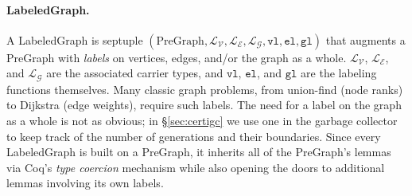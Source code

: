 \documentclass[acmsmall,screen]{acmart}
\newcommand{\li}[1]{{\texttt{\small #1}}}
\newcommand\hide[1]{}
\newcommand{\p}[1]{\ensuremath{\mathsf{#1}}} \newcommand{\m}[1]{\ensuremath{\mathit{#1}}} \newcommand{\ma}[1]{\ensuremath{\mathcal{#1}}} \let\ramify\lightning
\begin{document}
\hide
{In \S\ref{sec:spacegraph} we will tie a mathematical graph $\gamma$ to
a spatial graph predicate
$\p{graph}(x, \gamma)$.   As we will see, a $\p{graph}$ ``owns'' only the
spatial portion of $\gamma$ that is reachable
from $x$ even though $\gamma$ may have other valid vertices.
} 




\vspace{-0.75ex}

\paragraph{LabeledGraph.}
A LabeledGraph is septuple $(\mathrm{PreGraph},\ma{L_{V}},\ma{L_{E}},\ma{L_{G}}, \mathtt{vl},\mathtt{el},\mathtt{gl})$ that augments a PreGraph with \emph{labels} on
vertices, edges, and/or the graph as a whole. $\ma{L_{V}}$, $\ma{L_{E}}$, and $\ma{L_{G}}$
are the associated carrier types, and $\mathtt{vl}$, $\mathtt{el}$, and $\mathtt{gl}$
are the labeling functions themselves.
Many classic graph problems, from union-find (node ranks)
to Dijkstra (edge weights), require such labels.
The need for a label on the graph as a whole
is not as obvious; in \S\ref{sec:certigc} we use one in the garbage collector
to keep track of the number of generations and their boundaries.
Since every LabeledGraph is built on a PreGraph, it inherits all of the 
PreGraph's lemmas via
Coq's \emph{type coercion} mechanism while also opening the doors to 
additional lemmas involving its own labels.



\hide{\paragraph{LabeledGraph.}
A LabeledGraph is a PreGraph with the addition of \emph{labels} on
vertices, edges, and/or the graph as a whole. The need for such labels
is fairly clear; the bare structure of a graph can only
contain so much information, and many classic graph problems
such as graph coloring, shortest path, and network flow rely on
additional information in the form of labels. In our architecture, a
LabeledGraph inherits any lemmas proved about its associated PreGraph.
In addition, we can define additional lemmas that use labels,
\emph{e.g.} the union-find graph has an integer label denoting \emph{rank}.
We could prove a lemma that running \li{find} does not alter
any vertex's rank.
\hide{add string labels to edges and reason about a trie.}}
\end{document}
